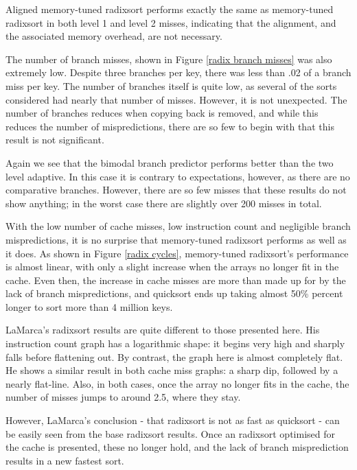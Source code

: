 Aligned memory-tuned radixsort performs exactly the same as memory-tuned radixsort in both
level 1 and level 2 misses, indicating that the alignment, and the associated
memory overhead, are not necessary.

The number of branch misses, shown in Figure \ref{radix branch misses} was also
extremely low. Despite three branches per key, there was less than .02 of a branch
miss per key. The number of branches itself is quite low, as several of the
sorts considered had nearly that number of misses. However, it is not
unexpected. The number of branches reduces when copying back is removed, and
while this reduces the number of mispredictions, there are so few to begin with
that this result is not significant.

Again we see that the bimodal branch predictor performs better than the two
level adaptive. In this case it is contrary to expectations, however, as
there are no comparative branches. However, there are so few misses that these
results do not show anything; in the worst case there are slightly over 200
misses in total.

With the low number of cache misses, low instruction count and negligible branch
mispredictions, it is no surprise that memory-tuned radixsort performs as well as it
does. As shown in Figure \ref{radix cycles}, memory-tuned radixsort's performance is
almost linear, with only a slight increase when the arrays no longer fit in the
cache.  Even then, the increase in cache misses are more than made up for by the
lack of branch mispredictions, and quicksort ends up taking almost 50\% percent
longer to sort more than 4 million keys.

LaMarca's radixsort results are quite different to those presented here. His
instruction count graph has a logarithmic shape: it begins very high and sharply
falls before flattening out. By contrast, the graph here is almost completely
flat. He shows a similar result in both cache miss graphs: a sharp dip, followed
by a nearly flat-line. Also, in both cases, once the array no longer fits in the
cache, the number of misses jumps to around 2.5, where they stay.

However, LaMarca's conclusion - that radixsort is not as fast as quicksort - can
be easily seen from the base radixsort results. Once an radixsort optimised for
the cache is presented, these no longer hold, and the lack of branch
misprediction results in a new fastest sort.

